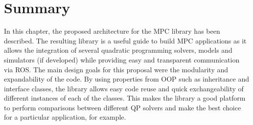 \section{Summary}

In this chapter, the proposed architecture for the MPC library has been described. The resulting library is a useful guide to build MPC applications as it allows the integration of several quadratic programming solvers, models and simulators (if developed) while providing easy and transparent communication via ROS. The main design goals for this proposal were the modularity and expandability of the code. By using properties from OOP such as inheritance and interface classes, the library allows easy code reuse and quick exchangeability of different instances of each of the classes. This makes the library a good platform to perform comparisons between different QP solvers and make the best choice for a particular application, for example. 




